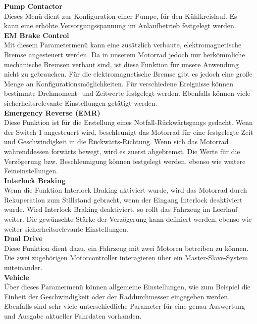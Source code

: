\textbf{Pump Contactor}\\[1mm]
Dieses Menü dient zur Konfiguration einer Pumpe, für den Kühlkreislauf. Es kann eine erhöhte Versorgungsspannung im Anlaufbetrieb festgelegt werden.
\\[3mm]

\textbf{EM Brake Control}\\[1mm]
Mit diesem Parametermenü kann eine zusätzlich verbaute, elektromagnetische Bremse angesteuert werden. Da in unserem Motorrad jedoch nur herkömmliche mechanische Bremsen verbaut sind, ist diese Funktion für unsere Anwendung nicht zu gebrauchen. Für die elektromagnetische Bremse gibt es jedoch eine große Menge an Konfigurationsmöglichkeiten. Für verschiedene Ereignisse können bestimmte Drehmoment- und Zeitwerte festgelegt werden. Ebenfalls können viele sicherheitsrelevante Einstellungen getätigt werden. 
\\[3mm]

\textbf{Emergency Reverse (EMR)}\\[1mm]
Diese Funktion ist für die Erstellung eines Notfall-Rückwärtsgangs gedacht. Wenn der Switch 1 angesteuert wird, beschleunigt das Motorrad für eine festgelegte Zeit und Geschwindigkeit in die Rückwärts-Richtung. Wenn sich das Motorrad währenddessen forwärts bewegt, wird es zuerst abgebremst. Die Werte für die Verzögerung bzw. Beschleunigung können festgelegt werden, ebenso wie weitere Feineinstellungen.
\\[3mm]



\textbf{Interlock Braking}\\[1mm]
Wenn die Funktion Interlock Braking aktiviert wurde, wird das Motorrad durch Rekuperation zum Stillstand gebracht, wenn der Eingang Interlock deaktiviert wurde. Wird Interlock Braking deaktiviert, so rollt das Fahrzeug im Leerlauf weiter. Die gewünschte Stärke der Verzögerung kann definiert werden, ebenso wie weiter sicherheitsrelevante Einstellungen.
\\[3mm]

\textbf{Dual Drive}\\[1mm]
Diese Funktion dient dazu, ein Fahrzeug mit zwei Motoren betreiben zu können. Die zwei zugehörigen Motorcontroller interagieren über ein Master-Slave-System miteinander.
\\[3mm]

\textbf{Vehicle}\\[1mm]
Über dieses Paramermenü können allgemeine Einstellungen, wie zum Beispiel die Einheit der Geschwindigkeit oder der Raddurchmesser eingegeben werden. Ebenfalls sind sehr viele unterschiedliche Parameter für eine genau Auswertung und Ausgabe aktueller Fahrdaten vorhanden.
\\[3mm]

